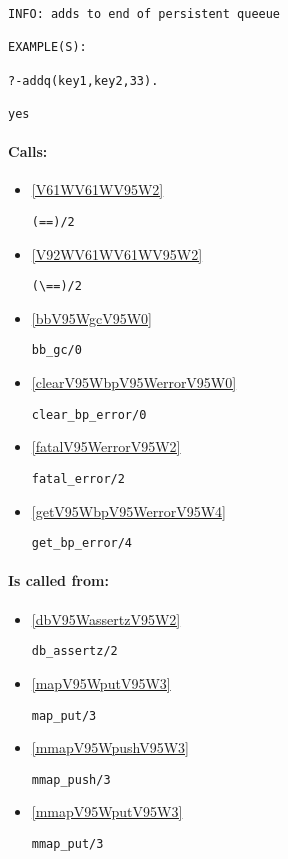 {\small \begin{verbatim}
INFO: adds to end of persistent queeue

EXAMPLE(S):

?-addq(key1,key2,33).

yes

\end{verbatim}}
\paragraph{Calls:} 
\begin{itemize}
\item \ref{V61WV61WV95W2} 
\begin{verbatim}
(==)/2
\end{verbatim}

\item \ref{V92WV61WV61WV95W2} 
\begin{verbatim}
(\==)/2
\end{verbatim}

\item \ref{bbV95WgcV95W0} 
\begin{verbatim}
bb_gc/0
\end{verbatim}

\item \ref{clearV95WbpV95WerrorV95W0} 
\begin{verbatim}
clear_bp_error/0
\end{verbatim}

\item \ref{fatalV95WerrorV95W2} 
\begin{verbatim}
fatal_error/2
\end{verbatim}

\item \ref{getV95WbpV95WerrorV95W4} 
\begin{verbatim}
get_bp_error/4
\end{verbatim}

\end{itemize}
\paragraph{Is called from:} 
\begin{itemize}
\item \ref{dbV95WassertzV95W2} 
\begin{verbatim}
db_assertz/2
\end{verbatim}

\item \ref{mapV95WputV95W3} 
\begin{verbatim}
map_put/3
\end{verbatim}

\item \ref{mmapV95WpushV95W3} 
\begin{verbatim}
mmap_push/3
\end{verbatim}

\item \ref{mmapV95WputV95W3} 
\begin{verbatim}
mmap_put/3
\end{verbatim}

\end{itemize}

